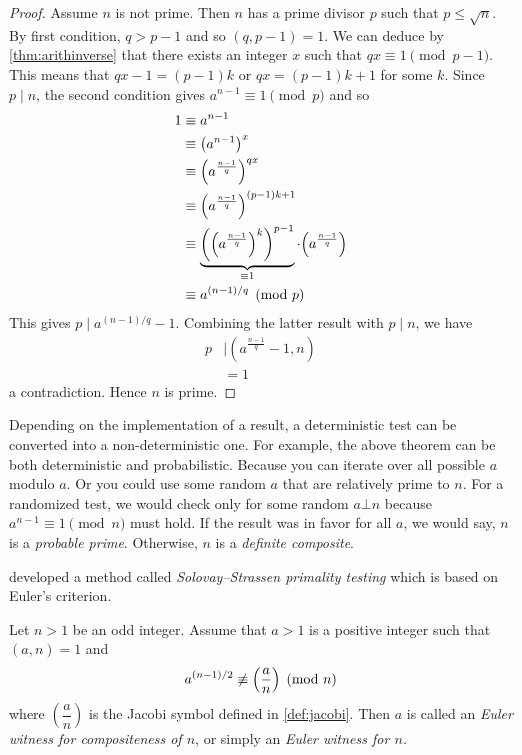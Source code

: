 \documentclass{subfiles}
\begin{document}
		\begin{proof}
			Assume $n$ is not prime. Then $n$ has a prime divisor $p$ such that $p \leq \sqrt n$. By first condition, $q>p-1$ and so $(q, p-1)=1$. We can deduce by \autoref{thm:arithinverse} that there exists an integer $x$ such that $qx \equiv 1 \pmod {p-1}$. This means that $qx-1 = (p-1)k$ or $qx = (p-1)k+1$ for some $k$. Since $p\mid n$, the second condition gives $a^{n-1} \equiv 1 \pmod p$ and so
				\begin{align*}
					1 & \equiv a^{n-1} \\
					  & \equiv \left(a^{n-1}\right)^{x}\\
					  & \equiv \func{}{a^{\frac{n-1}{q}}}^{qx}\\
					  & \equiv \func{}{a^{\frac{n-1}{q}}}^{(p-1)k+1}\\
					  & \equiv \underbrace{\func{}{\func{}{a^{\frac{n-1}{q}}}^{k}}^{p-1}}_{\equiv 1} \cdot \func{}{a^{\frac{n-1}{q}}}\\
					  & \equiv a^{(n-1)/q} \pmod p
				\end{align*}
			This gives $p\mid a^{(n-1)/q}-1$. Combining the latter result with $p\mid n$, we have
				\begin{align*}
					p
						& \mid \left(a^{\frac{n-1}{q}}-1,n\right)\\
						&=1
				\end{align*}
			a contradiction. Hence $n$ is prime.
		\end{proof}

		\begin{note}
			Depending on the implementation of a result, a deterministic test can be converted into a non-deterministic one. For example, the above theorem can be both deterministic and probabilistic. Because you can iterate over all possible $a$ modulo $a$. Or you could use some random $a$ that are relatively prime to $n$. For a randomized test, we would check only for some random $a\bot n$ because $a^{n-1}\equiv1\pmod n$ must hold. If the result was in favor for all $a$, we would say, $n$ is a \textit{probable prime}. Otherwise, $n$ is a \textit{definite composite}.
		\end{note}
	\textcite{solovay_strassen_1977} developed a method called \textit{Solovay--Strassen primality testing} which is based on Euler's criterion.

		\begin{definition}
			Let $n>1$ be an odd integer. Assume that $a>1$ is a positive integer such that $(a,n)=1$ and
				\begin{align*}
					a^{(n-1)/2} \not \equiv \func{}{\dfrac{a}{n}} \pmod n
				\end{align*}
			where $\left(\dfrac{a}{n}\right)$ is the Jacobi symbol defined in \eqref{def:jacobi}. Then $a$ is called an \textit{Euler witness for compositeness of $n$}, or simply an \textit{Euler witness for $n$.}
		\end{definition}
\end{document}
